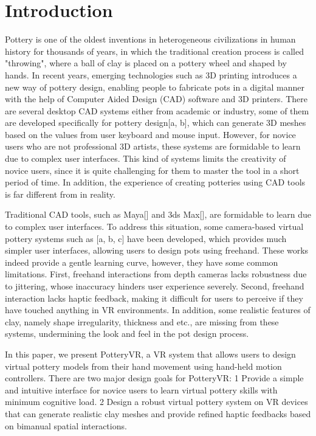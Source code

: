 \section{Introduction}
\label{sec:1}
Pottery is one of the oldest inventions in heterogeneous civilizations in human history for thousands of years, in which the traditional creation process is called "throwing", where a ball of clay is placed on a pottery wheel and shaped by hands. In recent years, emerging technologies such as 3D printing introduces a new way of pottery design, enabling people to fabricate pots in a digital manner with the help of Computer Aided Design (CAD) software and 3D printers. There are several desktop CAD systems either from academic or industry, some of them are developed specifically for pottery design[a, b], which can generate 3D meshes based on the values from user keyboard and mouse input. However, for novice users who are not professional 3D artists, these systems are formidable to learn due to complex user interfaces. This kind of systems limits the creativity of novice users, since it is quite challenging for them to master the tool in a short period of time. In addition, the experience of creating potteries using CAD tools is far different from in reality.

Traditional CAD tools, such as Maya[] and 3ds Max[], are formidable to learn due to complex user interfaces. To address this situation, some camera-based virtual pottery systems such as [a, b, c] have been developed, which provides much simpler user interfaces, allowing users to design pots using freehand. These works indeed provide a gentle learning curve, however, they have some common limitations. First, freehand interactions from depth cameras lacks robustness due to jittering, whose inaccuracy hinders user experience severely. Second, freehand interaction lacks haptic feedback, making it difficult for users to perceive if they have touched anything in VR environments. In addition, some realistic features of clay, namely shape irregularity, thickness and etc., are missing from these systems, undermining the look and feel in the pot design process.

In this paper, we present PotteryVR, a VR system that allows users to design virtual pottery models from their hand movement using hand-held motion controllers. There are two major design goals for PotteryVR:
1 Provide a simple and intuitive interface for novice users to learn virtual pottery skills with minimum cognitive load.
2 Design a robust virtual pottery system on VR devices that can generate realistic clay meshes and provide refined haptic feedbacks based on bimanual spatial interactions.

